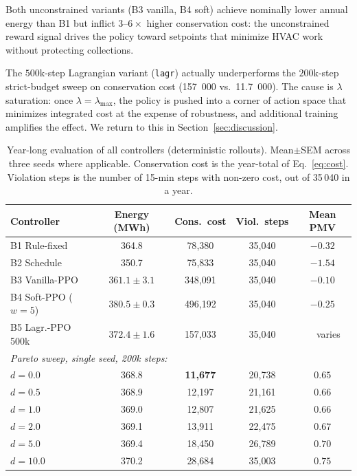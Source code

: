 Both unconstrained variants (B3 vanilla, B4 soft) achieve nominally
lower annual energy than B1 but inflict $3$--$6\times$ higher
conservation cost: the unconstrained reward signal drives the policy
toward setpoints that minimize HVAC work without protecting
collections.

The $500\mathrm{k}$-step Lagrangian variant (\texttt{lagr}) actually
underperforms the $200\mathrm{k}$-step strict-budget sweep on
conservation cost (\num{157}~000 vs.\ \num{11.7}~000). The cause is
$\lambda$ saturation: once $\lambda=\lambda_{\max}$, the policy is
pushed into a corner of action space that minimizes integrated cost at
the expense of robustness, and additional training amplifies the
effect. We return to this in Section~\ref{sec:discussion}.

\begin{table}[t]
\centering
\caption{Year-long evaluation of all controllers (deterministic
rollouts). Mean$\pm$SEM across three seeds where applicable.
Conservation cost is the year-total of Eq.~\eqref{eq:cost}.
Violation steps is the number of 15-min steps with non-zero cost,
out of 35\,040 in a year.}
\label{tab:headline}
\small
\setlength{\tabcolsep}{4pt}
\begin{tabular}{lcccc}
\toprule
Controller & Energy (MWh) & Cons.\ cost & Viol.\ steps & Mean PMV \\
\midrule
B1 Rule-fixed       & 364.8                       & 78{,}380   & 35{,}040 & $-0.32$ \\
B2 Schedule         & 350.7                       & 75{,}833   & 35{,}040 & $-1.54$ \\
B3 Vanilla-PPO      & $361.1\pm 3.1$              & 348{,}091  & 35{,}040 & $-0.10$ \\
B4 Soft-PPO ($w=5$) & $380.5\pm 0.3$              & 496{,}192  & 35{,}040 & $-0.25$ \\
B5 Lagr.-PPO 500k   & $372.4\pm 1.6$              & 157{,}033  & 35{,}040 & $\phantom{-}$varies \\
\midrule
\multicolumn{5}{l}{\emph{Pareto sweep, single seed, 200k steps:}}\\
$d=0.0$  & 368.8 & \textbf{11{,}677} & 20{,}738 & $0.65$ \\
$d=0.5$  & 368.9 & 12{,}197          & 21{,}161 & $0.66$ \\
$d=1.0$  & 369.0 & 12{,}807          & 21{,}625 & $0.66$ \\
$d=2.0$  & 369.1 & 13{,}911          & 22{,}475 & $0.67$ \\
$d=5.0$  & 369.4 & 18{,}450          & 26{,}789 & $0.70$ \\
$d=10.0$ & 370.2 & 28{,}684          & 35{,}003 & $0.75$ \\
\bottomrule
\end{tabular}
\end{table}

